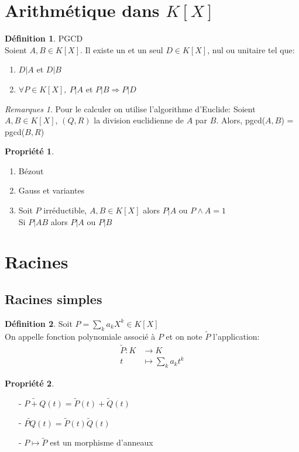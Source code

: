 \documentclass[fleqn]{article}
\theoremstyle{definition} \newtheorem*{defi}{D\'efinition}
\theoremstyle{definition} \newtheorem*{theo}{Th\'eor\`eme}
\theoremstyle{definition} \newtheorem*{coro}{Corollaire}
\theoremstyle{definition} \newtheorem*{nota}{Notation}
\theoremstyle{remark} \newtheorem*{rqs}{Remarques}
\theoremstyle{definition} \newtheorem*{prop}{Propri\'et\'e}
\begin{document}
\section{Arithm\'etique dans $K[X]$}
\begin{defi} PGCD\\
	Soient $A,B \in K[X]$. Il existe un et un seul $D \in K[X]$, nul ou unitaire tel que:
	\begin{enumerate}
		\item $D | A$ et $D | B$
		\item $\forall P \in K[X],\ P|A$ et $P|B \Rightarrow P|D$
	\end{enumerate}
	\begin{rqs} Pour le calculer on utilise l'algorithme d'Euclide: Soient $A,B \in K[X]$, $(Q, R)$ la division euclidienne de $A$ par
		$B$. Alors, pgcd($A,B$) = pgcd($B,R$)
	\end{rqs}
\end{defi}

\begin{prop} $ $
	\begin{enumerate}
		\item B\'ezout
		\item Gauss et variantes
		\item Soit $P$ irr\'eductible, $A,B \in K[X]$ alors $P|A$ ou $P \land A = 1$ \\
			Si $P | AB$ alors $P|A$ ou $P|B$
	\end{enumerate}
\end{prop}

\section{Racines}
\subsection{Racines simples}
\begin{defi} Soit $P = \sum_k a_k X^k \in K[X]$ \\
	On appelle fonction polynomiale associ\'e \`a $P$ et on note $\tilde{P}$ l'application: \begin{align*} \tilde{P}: K &\rightarrow K\\
	t &\mapsto \sum_k a_kt^k \end{align*}
\end{defi}

\begin{prop} $ $
	\begin{itemize}
		\item [-] $\tilde{P+Q}(t) = \tilde{P}(t) + \tilde{Q}(t)$
		\item [-] $\tilde{PQ}(t) = \tilde{P}(t) \tilde{Q}(t)$
		\item [-] $P \mapsto \tilde{P}$ est un morphisme d'anneaux
	\end{itemize}
\end{prop}
\end{document}

